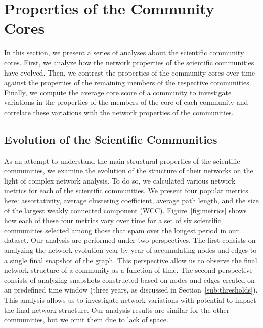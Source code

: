 \section{Properties of the Community Cores}

In this section, we present a series of analyses about the scientific community cores. First, we analyze how the network properties of the scientific communities have evolved. %
Then, we contrast the properties of the community cores over time against the properties of the remaining members of the respective communities. 
Finally, we compute the average core score of a community to investigate variations in the properties of the members of the core of each community and 
correlate these variations with the network properties of the communities.


\subsection{Evolution of the Scientific Communities}
\label{sub:time}

As an attempt to understand the main structural properties of the scientific communities, we examine the evolution of the structure of their networks on the light of complex
network analysis. To do so, we calculated various network metrics for each of the scientific communities. We present four popular metrics here: assortativity, average clustering
coefficient, average path length, and the size of the largest weakly connected component (WCC). Figure~\ref{fig:metrics} shows how each of these four metrics vary over time
for a set of six scientific communities selected among those that spam over the longest period in our dataset.  Our analysis are performed under two perspectives. The first
consists on analyzing the network evolution year by year of accumulating nodes and edges to a single final snapshot of the graph. This perspective allow us to observe the final
network structure of a community as a function of time. The second perspective consists of analyzing snapshots constructed based on nodes and edges created on an predefined time
window (three years, as discussed in Section~\ref{sub:thresholds}). This analysis allows us to investigate network variations with potential to impact the final network structure.
Our analysis results are similar for the other communities, but we omit them due to lack of space.

